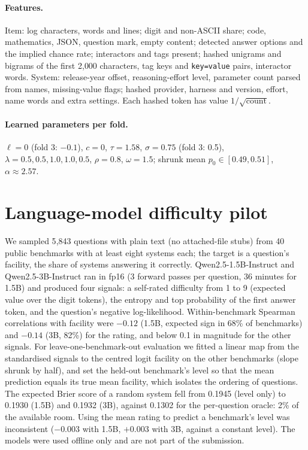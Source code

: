\documentclass{article}
\newcommand{\code}[1]{\texttt{#1}}
\begin{document}
\paragraph{Features.} Item: log characters, words and lines; digit and non-ASCII share; code, mathematics, JSON, question mark, empty content; detected answer options and the implied chance rate; interactors and tags present; hashed unigrams and bigrams of the first 2{,}000 characters, tag keys and \code{key=value} pairs, interactor words. System: release-year offset, reasoning-effort level, parameter count parsed from names, missing-value flags; hashed provider, harness and version, effort, name words and extra settings. Each hashed token has value $1/\sqrt{\text{count}}$.

\paragraph{Learned parameters per fold.} $\ell = 0$ (fold 3: $-0.1$), $c = 0$, $\tau = 1.58$, $\sigma = 0.75$ (fold 3: 0.5), $\lambda = 0.5, 0.5, 1.0, 1.0, 0.5$, $\rho = 0.8$, $\omega = 1.5$; shrunk mean $p_0 \in [0.49, 0.51]$, $\alpha \approx 2.57$.

\section{Language-model difficulty pilot}
\label{app:lm}
We sampled 5{,}843 questions with plain text (no attached-file stubs) from 40 public benchmarks with at least eight systems each; the target is a question's facility, the share of systems answering it correctly. Qwen2.5-1.5B-Instruct and Qwen2.5-3B-Instruct ran in fp16 (3 forward passes per question, 36 minutes for 1.5B) and produced four signals: a self-rated difficulty from 1 to 9 (expected value over the digit tokens), the entropy and top probability of the first answer token, and the question's negative log-likelihood. Within-benchmark Spearman correlations with facility were $-0.12$ (1.5B, expected sign in 68\% of benchmarks) and $-0.14$ (3B, 82\%) for the rating, and below 0.1 in magnitude for the other signals. For leave-one-benchmark-out evaluation we fitted a linear map from the standardised signals to the centred logit facility on the other benchmarks (slope shrunk by half), and set the held-out benchmark's level so that the mean prediction equals its true mean facility, which isolates the ordering of questions. The expected Brier score of a random system fell from 0.1945 (level only) to 0.1930 (1.5B) and 0.1932 (3B), against 0.1302 for the per-question oracle: 2\% of the available room. Using the mean rating to predict a benchmark's level was inconsistent ($-0.003$ with 1.5B, $+0.003$ with 3B, against a constant level). The models were used offline only and are not part of the submission.
\end{document}
